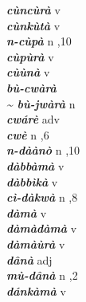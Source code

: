 \begin{multicols}{2}
{{\bfseries\itshape cùncùrà}} \relax  v  \relax   \relax  {} \relax   \relax  \\
{{\bfseries\itshape cùnkùtà}} \relax  v  \relax   \relax  {} \relax   \relax  \\
{{\bfseries\itshape n-cùpà}} \relax  n  ,10  \relax   \relax  \\
{{\bfseries\itshape cùpùrà}} \relax  v  \relax   \relax  {} \relax   \relax  \\
{{\bfseries\itshape cùùnà}} \relax  v  \relax   \relax  {} \relax   \relax  \\
{{\bfseries\itshape bù-cwàrà \\
{\textasciitilde} bù-jwàrà}} \relax  n   \relax  {} \relax   \relax  \\
{{\bfseries\itshape cwárè}} \relax  adv  \relax   \relax  {} \relax   \relax  \\
{{\bfseries\itshape cwè}} \relax  n  ,6  \relax   \relax  \\
{{\bfseries\itshape n-dàànò}} \relax  n  ,10  \relax   \relax  \\
{{\bfseries\itshape dàbbàmà}} \relax  v  \relax   \relax  {} \relax   \relax  \\
{{\bfseries\itshape dàbbìkà}} \relax  v  \relax  {} \relax   \relax  \\
{{\bfseries\itshape cì-dàkwà}} \relax  n  ,8  \relax   \relax  \\
{{\bfseries\itshape dàmà}} \relax  v  \relax   \relax  {} \relax   \relax  \\
{{\bfseries\itshape dàmàdàmà}} \relax  v  \relax   \relax  {} \relax   \relax  \\
{{\bfseries\itshape dàmàùrà}} \relax  v  \relax   \relax  {} \relax   \relax  \\
{{\bfseries\itshape dânà}} \relax  adj  \relax   \relax  {} \relax   \relax  \\
{{\bfseries\itshape mù-dânà}} \relax  n  ,2  \relax   \relax  \\
{{\bfseries\itshape dánkàmà}} \relax  v  \relax   \relax  {} \relax   \relax  \\

\end{multicols}
